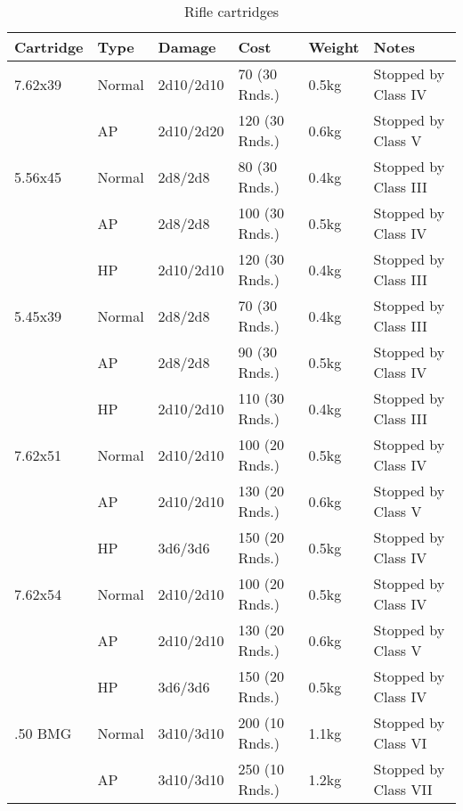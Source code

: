 \begin{table}
  \caption{Rifle cartridges}
  \label{tab:RifleCartridges}
  \begin{center}
    \begin{tabular}{| l | l | l | l | l | l |}
      \hline
      \textbf{Cartridge}  & \textbf{Type} & \textbf{Damage} &
      \textbf{Cost} & \textbf{Weight} & \textbf{Notes} \\ \hline

      7.62x39  & Normal  & 2d10/2d10  & 70 (30 Rnds.)  & 0.5kg & Stopped by Class IV \\ \hline
      \,       & AP      & 2d10/2d20  & 120 (30 Rnds.) & 0.6kg & Stopped by Class V \\ \hline
      5.56x45  & Normal  & 2d8/2d8    & 80 (30 Rnds.)  & 0.4kg & Stopped by Class III \\ \hline
      \,       & AP      & 2d8/2d8    & 100 (30 Rnds.) & 0.5kg & Stopped by Class IV \\ \hline
      \,       & HP      & 2d10/2d10  & 120 (30 Rnds.) & 0.4kg & Stopped by Class III \\ \hline
      5.45x39  & Normal  & 2d8/2d8    & 70 (30 Rnds.)  & 0.4kg & Stopped by Class III \\ \hline
      \,       & AP      & 2d8/2d8    & 90 (30 Rnds.)  & 0.5kg & Stopped by Class IV \\ \hline
      \,       & HP      & 2d10/2d10  & 110 (30 Rnds.) & 0.4kg & Stopped by Class III \\ \hline
      7.62x51  & Normal  & 2d10/2d10  & 100 (20 Rnds.) & 0.5kg & Stopped by Class IV \\ \hline
      \,       & AP      & 2d10/2d10  & 130 (20 Rnds.) & 0.6kg & Stopped by Class V \\ \hline
      \,       & HP      & 3d6/3d6    & 150 (20 Rnds.) & 0.5kg & Stopped by Class IV \\ \hline
      7.62x54  & Normal  & 2d10/2d10  & 100 (20 Rnds.) & 0.5kg & Stopped by Class IV \\ \hline
      \,       & AP      & 2d10/2d10  & 130 (20 Rnds.) & 0.6kg & Stopped by Class V \\ \hline
      \,       & HP      & 3d6/3d6    & 150 (20 Rnds.) & 0.5kg & Stopped by Class IV \\ \hline
      .50 BMG  & Normal  & 3d10/3d10  & 200 (10 Rnds.) & 1.1kg & Stopped by Class VI \\ \hline
      \,       & AP      & 3d10/3d10  & 250 (10 Rnds.) & 1.2kg & Stopped by Class VII \\ \hline

\end{tabular}
\end{center}
\end{table}
